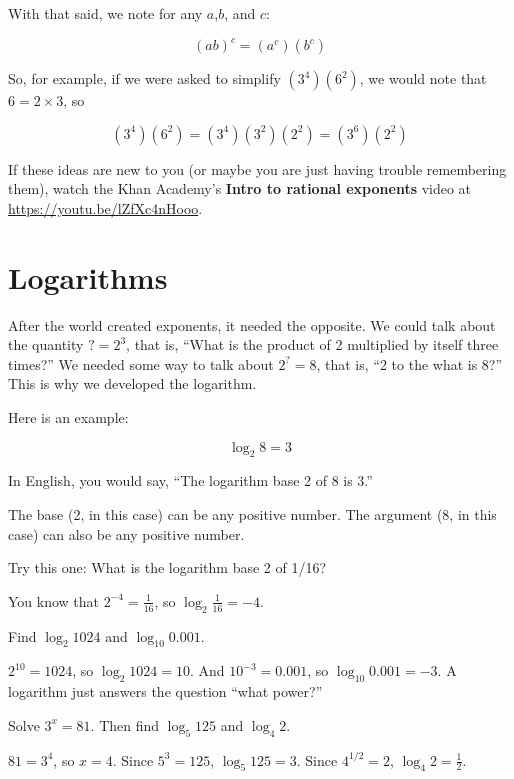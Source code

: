 With that said, we note for any $a$,$b$, and $c$:

$$\left(ab\right)^c = \left(a^c\right) \left(b^c\right)$$

So, for example, if we were asked to simplify
$\left(3^4\right)\left(6^2\right)$, we would note that $6 = 2 \times
3$, so

$$\left(3^4\right)\left(6^2\right) = \left(3^4\right)\left(3^2\right)\left(2^2\right)  = \left(3^6\right)\left(2^2\right)$$


If these ideas are new to you (or maybe you are just having trouble remembering them),
watch the Khan Academy's \textbf{Intro to rational exponents} video at
\url{https://youtu.be/lZfXc4nHooo}.



\section{Logarithms}
After the world created exponents, it needed the opposite. We
could talk about the quantity $? = 2^3$, that is, ``What is the
product of 2 multiplied by itself three times?''  We needed some way
to talk about $2^? = 8$, that is, ``2 to the what is 8?'' This is why we
developed the logarithm. 

Here is an example:

$$\log_{2}8 = 3$$

In English, you would say, ``The logarithm base 2 of 8 is 3.''

The base (2, in this case) can be any positive number. The argument
(8, in this case) can also be any positive number.

Try this one: What is the logarithm base 2 of 1/16?

You know that $2^{-4} = \frac{1}{16}$, so $\log_{2} \frac{1}{16} = -4$.

\begin{Worked}
\begin{Problem}
Find $\log_2 1024$ and $\log_{10} 0.001$.
\end{Problem}
\begin{Solution}
$2^{10} = 1024$, so $\log_2 1024 = 10$. And
$10^{-3} = 0.001$, so $\log_{10} 0.001 = -3$. A logarithm just answers the
question ``what power?''
\end{Solution}
\end{Worked}

\begin{Exercise}[title={Solve for the Exponent}, label=exp1]
Solve $3^x = 81$. Then find $\log_5 125$ and $\log_4 2$.
\end{Exercise}
\begin{Answer}[ref=exp1]
$81 = 3^4$, so $x = 4$. Since $5^3 = 125$, $\log_5 125 = 3$. Since
$4^{1/2} = 2$, $\log_4 2 = \frac{1}{2}$.
\end{Answer}

